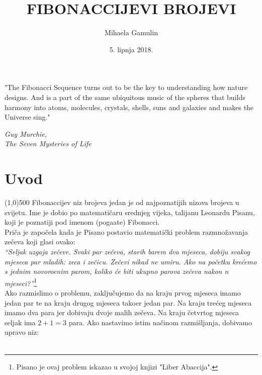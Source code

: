 \documentclass[14pt]{scrartcl}
\begin{document}
\title{FIBONACCIJEVI BROJEVI}
\author{ Mihaela Gamulin}
\date{{\normalsize5. lipnja 2018.}}
\maketitle
\vfill
\epigraph{\selectfont\fmmfamily
{\Large"The Fibonacci Sequence turns out to be the key to understanding how nature designs. And is a part of the same ubiquitous music of the spheres that builds harmony into atoms, molecules, crystals, shells, suns and galaxies and makes the Universe sing."}}{\textit{Guy Murchie, \\ The Seven Mysteries of Life}}
\newpage

\tableofcontents
\vspace{5mm}

\newpage
\section{Uvod}
\line(1,0){500}
\vspace{10mm}
Fibonaccijev niz brojeva jedan je od najpoznatijih nizova brojeva u svijetu. Ime je dobio po matemati\v{c}aru srednjeg vijeka, talijanu Leonardu Pisanu, koji je poznatiji pod imenom (poga\dj{}ate) Fibonacci.\\
Pri\v{c}a je zapo\v{c}ela kada je Pisano postavio matemati\v{c}ki problem razmno\v{z}avanja ze\v{c}eva koji glasi ovako:\\

\hspace{0.5cm}\textit{\enquote{Seljak uzgaja ze\v{c}eve. Svaki par ze\v{c}eva, starih barem dva mjeseca, dobiju svakog mjeseca par mladih: zeca i ze\v{c}icu. Ze\v{c}evi nikad ne umiru. Ako na po\v{c}etku kre\'{c}emo s jednim novoro\dj{}enim parom, koliko će biti ukupno parova ze\v{c}eva nakon n mjeseci?}}\footnote{Pisano je ovaj problem iskazao u svojoj knjizi "Liber Abaccija".}\\

Ako razmislimo o problemu, zaklju\v{c}ujemo da na kraju prvog mjeseca imamo jedan par te na kraju drugog mjeseca tako\dj{}er jedan par. Na kraju tre\'{c}eg mjeseca imamo dva para jer dobivaju dvoje malih ze\v{c}eva. Na kraju \v{c}etvrtog mjeseca seljak ima $2 + 1 = 3$ para. Ako nastavimo istim na\v{c}inom razmi\v{s}ljanja, dobivamo upravo niz:\\

\hspace{3cm}  
\\
\end{document}
